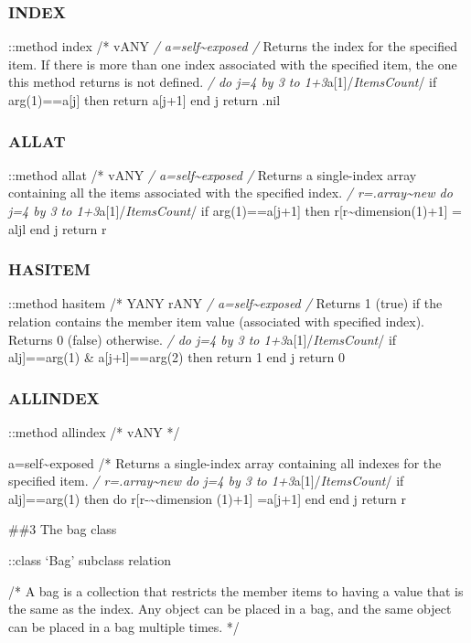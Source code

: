 \subsubsection{INDEX}\label{index}

::method index /* vANY \emph{/ a=self\textasciitilde exposed /} Returns
the index for the specified item. If there is more than one index
associated with the specified item, the one this method returns is not
defined. \emph{/ do j=4 by 3 to 1+3}a{[}1{]}/\emph{ItemsCount}/ if
arg(1)==a{[}j{]} then return a{[}j+1{]} end j return .nil

\subsubsection{ALLAT}\label{allat}

::method allat /* vANY \emph{/ a=self\textasciitilde exposed /} Returns
a single-index array containing all the items associated with the
specified index. \emph{/ r=.array\textasciitilde new do j=4 by 3 to
1+3}a{[}1{]}/\emph{ItemsCount}/ if arg(1)==a{[}j+1{]} then
r{[}r\textasciitilde dimension(1)+1{]} = aljl end j return r

\subsubsection{HASITEM}\label{hasitem}

::method hasitem /* YANY rANY \emph{/ a=self\textasciitilde exposed /}
Returns 1 (true) if the relation contains the member item value
(associated with specified index). Returns 0 (false) otherwise. \emph{/
do j=4 by 3 to 1+3}a{[}1{]}/\emph{ItemsCount}/ if alj{]}==arg(1) \&
a{[}j+l{]}==arg(2) then return 1 end j return 0

\subsubsection{ALLINDEX}\label{allindex}

::method allindex /* vANY */

a=self\textasciitilde exposed /* Returns a single-index array containing
all indexes for the specified item. \emph{/ r=.array\textasciitilde new
do j=4 by 3 to 1+3}a{[}1{]}/\emph{ItemsCount}/ if alj{]}==arg(1) then do
r{[}r-\textasciitilde dimension (1)+1{]} =a{[}j+1{]} end end j return r

\#\#3 The bag class

::class `Bag' subclass relation

/* A bag is a collection that restricts the member items to having a
value that is the same as the index. Any object can be placed in a bag,
and the same object can be placed in a bag multiple times. */

